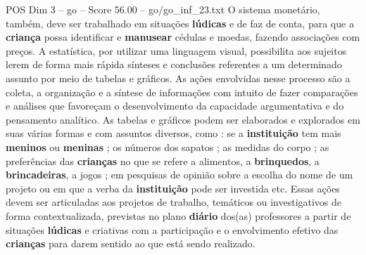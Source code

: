 \begin{textsample}{POS Dim 3 – go – Score 56.00 – go/go\_inf\_23.txt}
O sistema monetário, também, deve ser trabalhado em situações \textbf{lúdicas} e de faz de conta, para que a \textbf{criança} possa identificar e \textbf{manusear} cédulas e moedas, fazendo associações com preços.
A estatística, por utilizar uma linguagem visual, possibilita aos sujeitos lerem de forma mais rápida sínteses e conclusões referentes a um determinado assunto por meio de tabelas e gráficos.
As ações envolvidas nesse processo são a coleta, a organização e a síntese de informações com intuito de fazer comparações e análises que favoreçam o desenvolvimento da capacidade argumentativa e do pensamento analítico.
As tabelas e gráficos podem ser elaborados e explorados em suas várias formas e com assuntos diversos, como : se a \textbf{instituição} tem mais \textbf{meninos} ou \textbf{meninas} ; os números dos sapatos ; as medidas do corpo ; as preferências das \textbf{crianças} no que se refere a alimentos, a \textbf{brinquedos}, a \textbf{brincadeiras}, a jogos ; em pesquisas de opinião sobre a escolha do nome de um projeto ou em que a verba da \textbf{instituição} pode ser investida etc.
Essas ações devem ser articuladas aos projetos de trabalho, temáticos ou investigativos de forma contextualizada, previstas no plano \textbf{diário} dos(as) professores a partir de situações \textbf{lúdicas} e criativas com a participação e o envolvimento efetivo das \textbf{crianças} para darem sentido ao que está sendo realizado.

\end{textsample}
